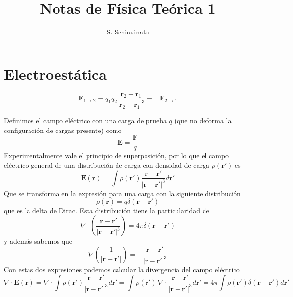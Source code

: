 \documentclass[a4paper]{article}
\title{Notas de Física Teórica 1}
\author{S. Schiavinato}
\date{}
\numberwithin{equation}{section} %
\renewcommand{\vec}[1]{\boldsymbol{#1}}
\begin{document}
\maketitle
\tableofcontents



\section{Electroestática}

\begin{equation}
\vec{F}_{1\to2} = q_1 q_2\frac{\vec{r}_2 - \vec{r}_1}{|\vec{r}_2 - \vec{r}_1|^3} = - \vec{F}_{2\to1}
\label{eq:electroestatica_coulomb}
\end{equation}

Definimos el campo eléctrico con una carga de prueba $q$ (que no deforma la configuración de cargas presente) como
\begin{equation}
\vec{E} = \frac{\vec{F}}{q}
\label{eq:campo_electrico}
\end{equation}
Experimentalmente vale el principio de superposición, por lo que el campo eléctrico general de una distribución de carga con densidad de carga $\rho(\vec{r}')$ es
\begin{equation}
\vec{E}(\vec{r}) = \int \rho(\vec{r}') \frac{\vec{r} - \vec{r}'}{|\vec{r} - \vec{r}'|^3} d\vec{r}'
\label{eq:campo_electrico_dist_carga}
\end{equation}
Que se transforma en la expresión para una carga con la siguiente distribución
\begin{equation}
 \rho(\vec{r}) = q \delta(\vec{r} - \vec{r}')
\end{equation}
que es la delta de Dirac. Esta distribución tiene la particularidad de
\begin{equation}
\nabla \cdot \left(\frac{\vec{r} - \vec{r}'}{|\vec{r} - \vec{r}'|^3}\right) = 4\pi\delta(\vec{r} - \vec{r}')
\end{equation}
y además sabemos que
\begin{equation}
\nabla \left(\frac{1}{|\vec{r} - \vec{r}'|}\right) = -\frac{\vec{r} - \vec{r}'}{|\vec{r} - \vec{r}'|^3}
\end{equation}
Con estas dos expresiones podemos calcular la divergencia del campo eléctrico
\[ \nabla \cdot \vec{E}(\vec{r}) = \nabla \cdot \int \rho(\vec{r}') \frac{\vec{r} - \vec{r}'}{|\vec{r} - \vec{r}'|^3} d\vec{r}' = \int \rho(\vec{r}') \, \nabla \cdot \frac{\vec{r} - \vec{r}'}{|\vec{r} - \vec{r}'|^3} d\vec{r}' = 4\pi \int \rho(\vec{r}') \delta(\vec{r} - \vec{r}') d\vec{r}'\]
\end{document}

